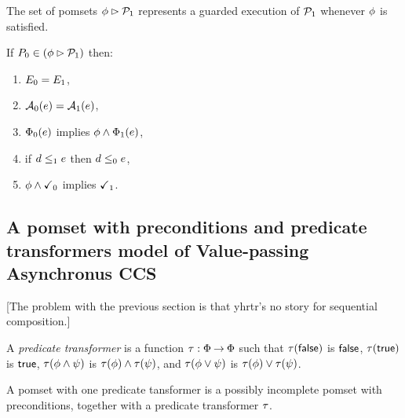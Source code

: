 The set of pomsets $\phi\mathbin\rhd\mathcal{P}_1$ represents a guarded execution of $\mathcal{P}_1$ whenever $\phi$ is satisfied.
\begin{definition}
  \label{defn:pomset-guard}
  If $P_0 \in (\phi\mathbin\rhd\mathcal{P}_1)$ then:
  \begin{enumerate}
  \item $E_0 = E_1$,
  \item $\mathcal{A}_0(e) = \mathcal{A}_1(e)$,
  \item $\Phi_0(e)$ implies $\phi\land\Phi_1(e)$,
  \item if $d\le_1e$ then $d\le_0e$,
  \item $\phi\land\checkmark_0$ implies $\checkmark_1$.
    \setcounter{pomsetGuardCount}{\value{enumi}}
  \end{enumerate}
\end{definition}

\subsection{A pomset with preconditions and predicate transformers model of Value-passing Asynchronus CCS}

[The problem with the previous section is that yhrtr's no story for sequential composition.]

\begin{definition}
  A \emph{predicate transformer} is a function
  $\tau:\Phi\mathbin\rightarrow\Phi$ such that
  $\tau(\mathsf{false})$ is $\mathsf{false}$,
  $\tau(\mathsf{true})$ is $\mathsf{true}$,
  $\tau(\phi\land\psi)$ is $\tau(\phi)\land\tau(\psi)$, and
  $\tau(\phi\lor\psi)$ is $\tau(\phi)\lor\tau(\psi)$.
\end{definition}

\begin{definition}
  A pomset with one predicate tansformer is a possibly incomplete
  pomset with preconditions, together with a predicate transformer $\tau$.
\end{definition}

